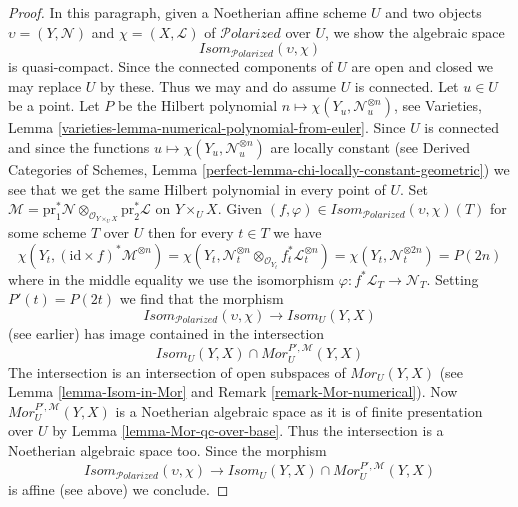 \documentclass[10pt,a4paper]{amsart}
\theoremstyle{plain}
\theoremstyle{definition}
\theoremstyle{remark}
\numberwithin{equation}{subsection}
\def\Polarizedstack{\mathcal{P}\!\mathit{olarized}}
\begin{document}
\begin{proof}
\medskip\noindent
In this paragraph, given a Noetherian affine scheme $U$ and two objects
$\upsilon = (Y, \mathcal{N})$ and $\chi = (X, \mathcal{L})$
of $\Polarizedstack$ over $U$, we show the algebraic space
$$
\mathit{Isom}_{\Polarizedstack}(\upsilon, \chi)
$$
is quasi-compact. Since the connected components of $U$ are open and closed
we may replace $U$ by these. Thus we may and do assume $U$ is connected.
Let $u \in U$ be a point. Let $P$ be the Hilbert polynomial
$n \mapsto \chi(Y_u, \mathcal{N}_u^{\otimes n})$, see
Varieties, Lemma \ref{varieties-lemma-numerical-polynomial-from-euler}.
Since $U$ is connected and since
the functions $u \mapsto \chi(Y_u, \mathcal{N}_u^{\otimes n})$
are locally constant (see 
Derived Categories of Schemes, Lemma
\ref{perfect-lemma-chi-locally-constant-geometric})
we see that we get the same Hilbert polynomial in every point of $U$.
Set
$\mathcal{M} = \text{pr}_1^*\mathcal{N}
\otimes_{\mathcal{O}_{Y \times_U X}} \text{pr}_2^*\mathcal{L}$
on $Y \times_U X$. Given
$(f, \varphi) \in \mathit{Isom}_{\Polarizedstack}(\upsilon, \chi)(T)$
for some scheme $T$ over $U$ then for every $t \in T$ we have
$$
\chi(Y_t, (\text{id} \times f)^*\mathcal{M}^{\otimes n}) =
\chi(Y_t,
\mathcal{N}_t^{\otimes n} \otimes_{\mathcal{O}_{Y_t}}
f_t^*\mathcal{L}_t^{\otimes n}) =
\chi(Y_t, \mathcal{N}_t^{\otimes 2n}) = P(2n)
$$
where in the middle equality we use the isomorphism
$\varphi : f^*\mathcal{L}_T \to \mathcal{N}_T$.
Setting $P'(t) = P(2t)$ we find that the morphism
$$
\mathit{Isom}_{\Polarizedstack}(\upsilon, \chi)
\longrightarrow
\mathit{Isom}_U(Y, X)
$$
(see earlier) has image contained in the intersection
$$
\mathit{Isom}_U(Y, X) \cap \mathit{Mor}^{P', \mathcal{M}}_U(Y, X)
$$
The intersection is an intersection of open subspaces of
$\mathit{Mor}_U(Y, X)$ (see Lemma \ref{lemma-Isom-in-Mor} and
Remark \ref{remark-Mor-numerical}).
Now $\mathit{Mor}^{P', \mathcal{M}}_U(Y, X)$
is a Noetherian algebraic space as it is of finite
presentation over $U$ by Lemma \ref{lemma-Mor-qc-over-base}.
Thus the intersection
is a Noetherian algebraic space too. Since the morphism
$$
\mathit{Isom}_{\Polarizedstack}(\upsilon, \chi)
\longrightarrow
\mathit{Isom}_U(Y, X) \cap \mathit{Mor}^{P', \mathcal{M}}_U(Y, X)
$$
is affine (see above) we conclude.
\end{proof}
\end{document}
